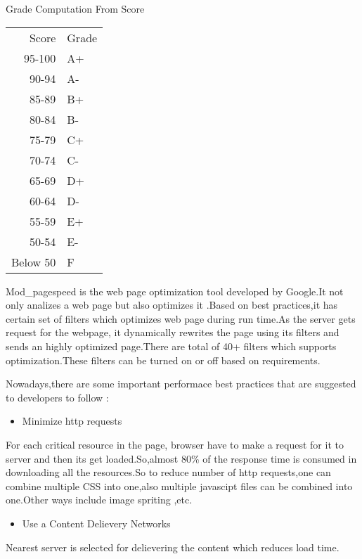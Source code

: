 \documentclass[11pt]{article}
\begin{document}
Grade Computation From Score


\begin{center}
\begin{tabular}{rl}
    Score  &  Grade  \\
   95-100  &  A+     \\
    90-94  &  A-     \\
    85-89  &  B+     \\
    80-84  &  B-     \\
    75-79  &  C+     \\
    70-74  &  C-     \\
    65-69  &  D+     \\
    60-64  &  D-     \\
    55-59  &  E+     \\
    50-54  &  E-     \\
 Below 50  &  F      \\
\end{tabular}
\end{center}



Mod\_pagespeed is the web page optimization tool developed by Google.It not only analizes a web page but also optimizes it .Based on best practices,it has certain set of filters which optimizes web page during run time.As the server gets request for the webpage, it dynamically rewrites the page using its filters and sends an highly optimized page.There are total of 40+ filters which supports optimization.These filters can be turned on or off based on requirements. 

Nowadays,there are some important performace best practices that are suggested to developers to follow :
\begin{itemize}
\item Minimize http requests
\end{itemize}
For each critical resource in the page, browser have to make a request  for it to server and then its get loaded.So,almost 80\% of the response time is consumed in downloading all the resources.So to reduce number of http requests,one can combine multiple CSS into one,also multiple javascipt files can be combined into one.Other ways include image spriting ,etc.

\begin{itemize}
\item Use a Content Delievery Networks
\end{itemize}
Nearest server is selected for delievering the content which reduces load time.
\end{document}
